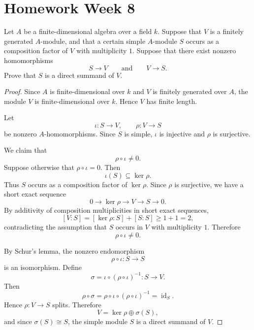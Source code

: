 \section{Homework Week 8}

\begin{exercise}
    Let \(A\) be a finite-dimensional algebra over a field \(k\).
    Suppose that \(V\) is a finitely generated \(A\)-module, and that a certain simple
    \(A\)-module \(S\) occurs as a composition factor of \(V\) with multiplicity \(1\).
    Suppose that there exist nonzero homomorphisms
    \[
    S \longrightarrow V
    \qquad\text{and}\qquad
    V \longrightarrow S.
    \]
    Prove that \(S\) is a direct summand of \(V\).
    \end{exercise}
    
    \begin{proof}
    Since \(A\) is finite-dimensional over \(k\) and \(V\) is finitely generated over \(A\),
    the module \(V\) is finite-dimensional over \(k\). Hence \(V\) has finite length.
    
    Let
    \[
    \iota:S\longrightarrow V,
    \qquad
    \rho:V\longrightarrow S
    \]
    be nonzero \(A\)-homomorphisms. Since \(S\) is simple, \(\iota\) is injective and
    \(\rho\) is surjective.
    
    We claim that
    \[
    \rho\circ \iota\neq 0.
    \]
    Suppose otherwise that \(\rho\circ\iota=0\). Then
    \[
    \iota(S)\subseteq \ker\rho.
    \]
    Thus \(S\) occurs as a composition factor of \(\ker\rho\). Since \(\rho\) is surjective,
    we have a short exact sequence
    \[
    0\longrightarrow \ker\rho \longrightarrow V \longrightarrow S \longrightarrow 0.
    \]
    By additivity of composition multiplicities in short exact sequences,
    \[
    [V:S]=[\ker\rho:S]+[S:S]\geq 1+1=2,
    \]
    contradicting the assumption that \(S\) occurs in \(V\) with multiplicity \(1\).
    Therefore
    \[
    \rho\circ\iota\neq 0.
    \]
    
    By Schur's lemma, the nonzero endomorphism
    \[
    \rho\circ\iota:S\longrightarrow S
    \]
    is an isomorphism. Define
    \[
    \sigma=\iota\circ(\rho\circ\iota)^{-1}:S\longrightarrow V.
    \]
    Then
    \[
    \rho\circ\sigma
    =
    \rho\circ\iota\circ(\rho\circ\iota)^{-1}
    =
    \operatorname{id}_S.
    \]
    Hence \(\rho:V\to S\) splits. Therefore
    \[
    V=\ker\rho\oplus \sigma(S),
    \]
    and since \(\sigma(S)\cong S\), the simple module \(S\) is a direct summand of \(V\).
    \end{proof}
    
